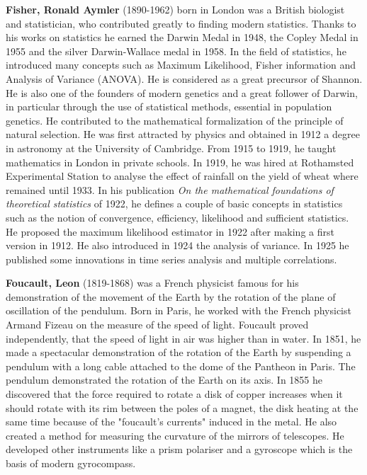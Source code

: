 \textbf{Fisher, Ronald Aymler} (1890-1962) born in London was a British biologist and statistician, who contributed greatly to finding modern statistics. Thanks to his works on statistics he earned the Darwin Medal in 1948, the Copley Medal in 1955 and the silver Darwin-Wallace  medal in 1958. In the field of statistics, he introduced many concepts such as Maximum Likelihood, Fisher information and Analysis of Variance (ANOVA). He is considered as a great precursor of Shannon. He is also one of the founders of modern genetics and a great follower of Darwin, in particular through the use of statistical methods, essential in population genetics. He contributed to the mathematical formalization of the principle of natural selection. He was first attracted by physics and obtained in 1912 a degree in astronomy at the University of Cambridge. From 1915 to 1919, he taught mathematics in London in private schools. In 1919, he was hired at Rothamsted Experimental Station to analyse the effect of rainfall on the yield of wheat where remained until 1933. In his publication \textit{On the mathematical foundations of theoretical statistics} of 1922, he defines a couple of basic concepts in statistics such as the notion of convergence, efficiency, likelihood and sufficient statistics. He proposed the maximum likelihood estimator in 1922 after making a first version in 1912. He also introduced in 1924 the analysis of variance. In 1925 he published some innovations in time series analysis and multiple correlations.

\textbf{Foucault, Leon} (1819-1868) was a French physicist famous for his demonstration of the movement of the Earth by the rotation of the plane of oscillation of the pendulum. Born in Paris, he worked with the French physicist Armand Fizeau on the measure of the speed of light. Foucault proved independently, that the speed of light in air was higher than in water. In 1851, he made a spectacular demonstration of the rotation of the Earth by suspending a pendulum with a long cable attached to the dome of the Pantheon in Paris. The pendulum demonstrated the rotation of the Earth on its axis. In 1855 he discovered that the force required to rotate a disk of copper increases when it should rotate with its rim between the poles of a magnet, the disk heating at the same time because of the "foucault's currents" induced in the metal. He also created a method for measuring the curvature of the mirrors of telescopes. He developed other instruments like a prism polariser and a gyroscope which is the basis of modern gyrocompass.

